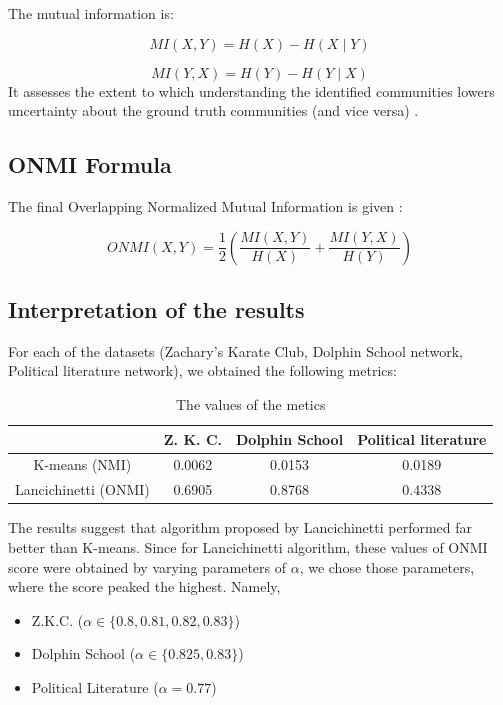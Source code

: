 \documentclass[conference]{IEEEtran}
\begin{document}
The mutual information is:

\[
MI(X,Y) = H(X) - H(X \mid Y)
\]

\[
MI(Y,X) = H(Y) - H(Y \mid X)
\]
It assesses the extent to which understanding the identified communities lowers uncertainty about the ground truth communities (and vice versa) \cite{mutual}.
\subsection*{ONMI Formula}

The final Overlapping Normalized Mutual Information is given \cite{lancichinetti2009detecting}\cite{mutual}:

\[
ONMI(X,Y) = \frac{1}{2} \left( \frac{MI(X,Y)}{H(X)} + \frac{MI(Y,X)}{H(Y)} \right)
\]


\subsection*{Interpretation of the results}

For each of the datasets (Zachary's Karate Club, Dolphin School network, Political literature network), we obtained the following metrics: 

\begin{table}[ht]
\centering
\begin{tabular}{|c|c|c|c|}
\hline
          & Z. K. C. & Dolphin School & Political literature \\
\hline
K-means (NMI)    & 0.0062 & 0.0153 & 0.0189 \\
Lancichinetti  (ONMI)   & 0.6905 & 0.8768 & 0.4338 \\
\hline
\end{tabular}
\caption{The values of the metics}
\end{table}

The results suggest that algorithm proposed by Lancichinetti performed far better than K-means. Since for Lancichinetti algorithm, these values of ONMI score were obtained by varying parameters of $\alpha$, we chose those parameters, where the score peaked the highest. Namely, 
\begin{itemize}
    \item Z.K.C. ($\alpha \in \{ 0.8, 0.81, 0.82, 0.83\}$)
    \item Dolphin School ($\alpha \in \{0.825, 0.83\}$)
    \item Political Literature ($\alpha = 0.77$)
\end{itemize}
\end{document}
